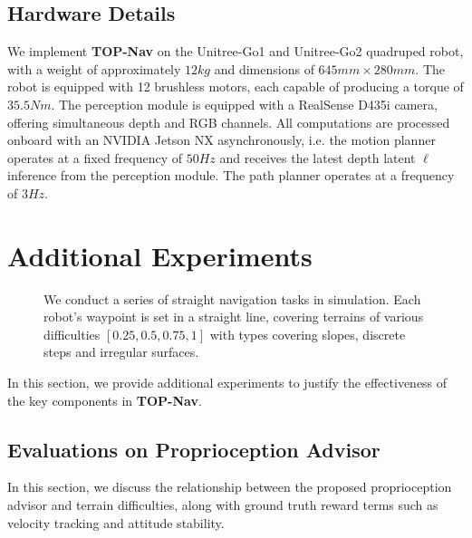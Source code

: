 \documentclass[conference]{IEEEtran}
\begin{document}
\subsection{Hardware Details}
We implement \textbf{TOP-Nav} on the Unitree-Go1 and Unitree-Go2 quadruped robot, with a weight of approximately $12 kg$ and dimensions of $645 mm \times 280 mm$. The robot is equipped with 12 brushless motors, each capable of producing a torque of $35.5 Nm$. The perception module is equipped with a RealSense D435i camera, offering simultaneous depth and RGB channels. All computations are processed onboard with an NVIDIA Jetson NX asynchronously, i.e. the motion planner operates at a fixed frequency of $50Hz$ and receives the latest depth latent $\bm{\ell}$ inference from the perception module. The path planner operates at a frequency of ${3Hz}$. 


\section{Additional Experiments}

\begin{figure}[t]
\caption{We conduct a series of straight navigation tasks in simulation. Each robot's waypoint is set in a straight line, covering terrains of various difficulties $[0.25,0.5,0.75,1]$ with types covering slopes, discrete steps and irregular surfaces.}
\label{propadvisor}
\end{figure}

In this section, we provide additional experiments to justify the effectiveness of the key components in \textbf{TOP-Nav}.

\subsection{Evaluations on Proprioception Advisor}
In this section, we discuss the relationship between the proposed proprioception advisor and terrain difficulties, along with ground truth reward terms such as velocity tracking and attitude stability.
\end{document}
